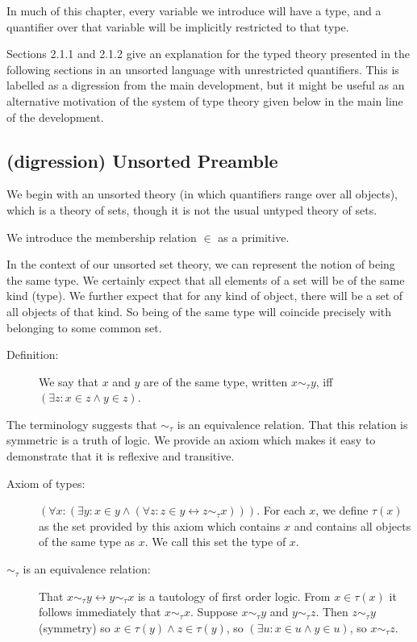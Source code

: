\documentclass[12pt]{book}
\begin{document}
In much of this chapter, every variable
we introduce will have a type, and a quantifier over that variable
will be implicitly restricted to that type.

Sections 2.1.1 and 2.1.2 give an explanation for the typed theory presented in the following sections in an unsorted language with unrestricted quantifiers.  This is labelled as a digression from the main development, but it might be useful as an alternative motivation of the system of type theory given below in the main line of the development.

\subsection{(digression) Unsorted Preamble}

We begin with an unsorted theory (in which quantifiers range over all objects), which is a theory of sets, though it is not the usual untyped theory of sets.

We introduce the membership relation $\in$ as a primitive.

In the context of our unsorted set theory, we can represent the notion of being the same type.  We certainly expect that all elements of a set will be of the same kind (type).
We further expect that for any kind of object, there will be a set of all objects of that kind.  So being of the same type will coincide precisely with belonging to some common set.

\begin{description}

\item[Definition:]  We say that $x$ and $y$ are of the same type, written $x \sim_\tau y$, iff $(\exists z:x \in z \wedge y \in z)$.

\end{description}

The terminology suggests that $\sim_\tau$ is an equivalence relation.  That this relation is symmetric is a truth of logic.  We provide an axiom which makes it easy to demonstrate
that it is reflexive and transitive.

\begin{description}

\item[Axiom of types:]  $(\forall x:(\exists y:x\in y \wedge (\forall z:z \in y \leftrightarrow z \sim_\tau x))).$  For each $x$, we define $\tau(x)$ as the set provided by this
axiom which contains $x$ and contains all objects of the same type as $x$.  We call this set the type of $x$.

\item[$\sim_\tau$ is an equivalence relation:]  That $x \sim_\tau y \leftrightarrow y \sim_\tau x$ is a tautology of first order logic.  From $x \in \tau(x)$ it follows
immediately that $x \sim_\tau x$.  Suppose $x \sim_\tau y$ and $y \sim_\tau z$.  Then $z \sim_\tau y$ (symmetry) so $x \in \tau(y) \wedge z \in \tau(y)$, so
$(\exists u:x \in u \wedge y \in u)$, so $x \sim_\tau z$.

\end{description}
\end{document}
